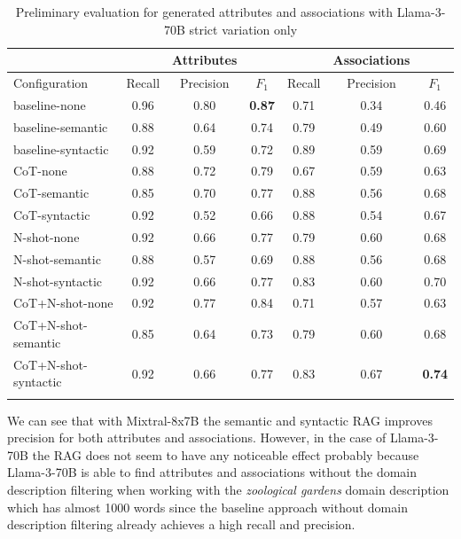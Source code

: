 \begin{table}[!h]
    \scriptsize
    \centering
    \setlength{\tabcolsep}{0.5em}
    \begin{tabular}{lcccccc}
    \toprule
        & & Attributes & & & Associations & \\
     \toprule
        Configuration & Recall & Precision & $F_1$ & Recall & Precision & $F_1$ \\
    \toprule
    
    \addlinespace
         baseline-none        & 0.96 & 0.80 & \textbf{0.87} & 0.71 & 0.34 & 0.46 \\
    	 baseline-semantic    & 0.88 & 0.64 & 0.74 & 0.79 & 0.49 & 0.60 \\
         baseline-syntactic   & 0.92 & 0.59 & 0.72 & 0.89 & 0.59 & 0.69 \\
         CoT-none             & 0.88 & 0.72 & 0.79 & 0.67 & 0.59 & 0.63 \\
         CoT-semantic         & 0.85 & 0.70 & 0.77 & 0.88 & 0.56 & 0.68 \\
         CoT-syntactic        & 0.92 & 0.52 & 0.66 & 0.88 & 0.54 & 0.67 \\
         N-shot-none          & 0.92 & 0.66 & 0.77 & 0.79 & 0.60 & 0.68 \\
         N-shot-semantic      & 0.88 & 0.57 & 0.69 & 0.88 & 0.56 & 0.68 \\
         N-shot-syntactic     & 0.92 & 0.66 & 0.77 & 0.83 & 0.60 & 0.70 \\
         CoT+N-shot-none      & 0.92 & 0.77 & 0.84 & 0.71 & 0.57 & 0.63 \\
         CoT+N-shot-semantic  & 0.85 & 0.64 & 0.73 & 0.79 & 0.60 & 0.68 \\
         CoT+N-shot-syntactic & 0.92 & 0.66 & 0.77 & 0.83 & 0.67 & \textbf{0.74} \\
    \addlinespace
    \bottomrule
    \addlinespace
    \end{tabular}
    \caption{Preliminary evaluation for generated attributes and associations with Llama-3-70B strict variation only}
    \label{tab:preliminary-llama}
\end{table}

We can see that with Mixtral-8x7B the semantic and syntactic RAG improves precision for both attributes and associations. However, in the case of Llama-3-70B the RAG does not seem to have any noticeable effect probably because Llama-3-70B is able to find attributes and associations without the domain description filtering when working with the \textit{zoological gardens} domain description which has almost 1000 words since the baseline approach without domain description filtering already achieves a high recall and precision. %

